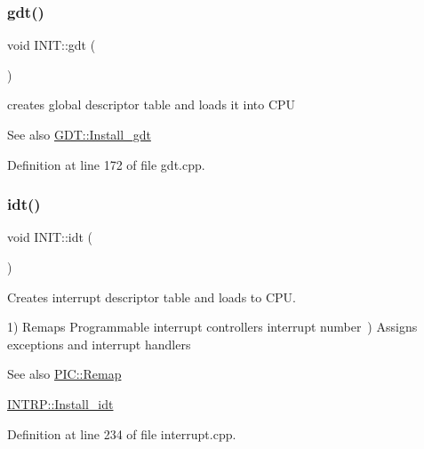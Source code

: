 \subsubsection{\texorpdfstring{gdt()}{gdt()}}
{\footnotesize\ttfamily void I\+N\+I\+T\+::gdt (\begin{DoxyParamCaption}{ }\end{DoxyParamCaption})}



creates global descriptor table and loads it into C\+PU 

\begin{DoxySeeAlso}{See also}
\hyperlink{namespace_g_d_t_a174feb7c5a037cc991bf4eb27c256366}{G\+D\+T\+::\+Install\+\_\+gdt} 
\end{DoxySeeAlso}


Definition at line 172 of file gdt.\+cpp.

\mbox{\label{namespace_i_n_i_t_aec8e9f01cb09653075b6e610096b3ca9}} 
\subsubsection{\texorpdfstring{idt()}{idt()}}
{\footnotesize\ttfamily void I\+N\+I\+T\+::idt (\begin{DoxyParamCaption}{ }\end{DoxyParamCaption})}



Creates interrupt descriptor table and loads to C\+PU. 

1) Remaps Programmable interrupt controller\textquotesingle{}s interrupt number~) Assigns exceptions and interrupt handlers \begin{DoxySeeAlso}{See also}
\hyperlink{namespace_p_i_c_a2a04fe95329faacc43f00ad30fe554b9}{P\+I\+C\+::\+Remap} 

\hyperlink{namespace_i_n_t_r_p_a139b273cc1e45d3c2fdfe0d387a98518}{I\+N\+T\+R\+P\+::\+Install\+\_\+idt} 
\end{DoxySeeAlso}


Definition at line 234 of file interrupt.\+cpp.

\mbox{\label{namespace_i_n_i_t_ac811302ce0948a6a097b445b811f9c14}} 
